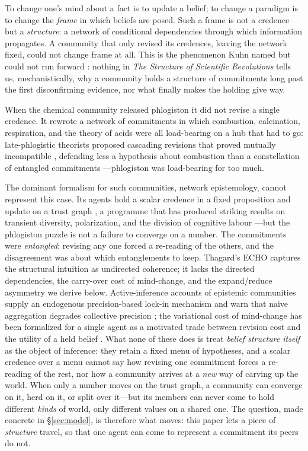 \documentclass[11pt]{article}
\begin{document}
To change one's mind about a fact is to update a belief; to change a paradigm is to change the
\emph{frame} in which beliefs are posed. Such a frame is not a credence but a \emph{structure}: a
network of conditional dependencies through which information propagates. A community that only
revised its credences, leaving the network fixed, could not change frame at all. This is the
phenomenon Kuhn named but could not run forward \citep{kuhn1962}: nothing in \emph{The Structure of
Scientific Revolutions} tells us, mechanistically, why a community holds a structure of commitments
long past the first disconfirming evidence, nor what finally makes the holding give way.

When the chemical community released phlogiston it did not revise a single credence. It rewrote a
network of commitments in which combustion, calcination, respiration, and the theory of acids were
all load-bearing on a hub that had to go: late-phlogistic theorists proposed cascading revisions that
proved mutually incompatible \citep{blumenthal2017,holmes2000}, defending less a hypothesis about
combustion than a constellation of entangled commitments \citep{boantza2011}---phlogiston was
load-bearing for too much.

The dominant formalism for such communities, network epistemology, cannot represent this case. Its
agents hold a scalar credence in a fixed proposition and update on a trust graph
\citep{zollman2010,oconnor2019,zollman2013}, a programme that has produced striking results on
transient diversity, polarization, and the division of cognitive labour
\citep{jonard2025,michelini2023,kitcher1990,strevens2003}---but the phlogiston puzzle is not a failure
to converge on a number. The commitments were \emph{entangled}: revising any one forced a re-reading
of the others, and the disagreement was about which entanglements to keep. Thagard's ECHO
\citep{thagard1989,thagard1990} captures the structural intuition as undirected coherence; it lacks
the directed dependencies, the carry-over cost of mind-change, and the expand/reduce asymmetry we
derive below. Active-inference accounts of epistemic communities supply an endogenous precision-based
lock-in mechanism \citep{albarracin2022} and warn that naive aggregation degrades collective precision
\citep{friston2023federated,waade2025}; the variational cost of mind-change has been formalized for a
single agent as a motivated trade between revision cost and the utility of a held belief
\citep{hyland2025}. What none of these does is treat \emph{belief structure itself} as the object of
inference: they retain a fixed menu of hypotheses, and a scalar credence over a menu cannot say how
revising one commitment forces a re-reading of the rest, nor how a community arrives at a \emph{new}
way of carving up the world. When only a number moves on the trust graph, a community can converge
on it, herd on it, or split over it---but its members can never come to hold different \emph{kinds}
of world, only different values on a shared one. The question, made concrete in \S\ref{sec:model},
is therefore what moves: this paper lets a piece of \emph{structure} travel, so that one agent can
come to represent a commitment its peers do not.
\end{document}
